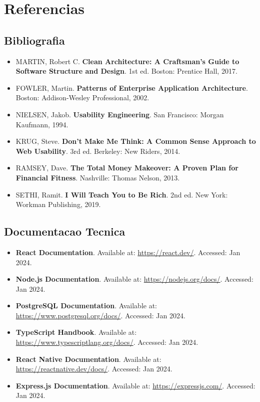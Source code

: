 \section{Referencias}

\subsection{Bibliografia}

\begin{itemize}
    \item MARTIN, Robert C. \textbf{Clean Architecture: A Craftsman's Guide to Software Structure and Design}. 1st ed. Boston: Prentice Hall, 2017.
    
    \item FOWLER, Martin. \textbf{Patterns of Enterprise Application Architecture}. Boston: Addison-Wesley Professional, 2002.
    
    \item NIELSEN, Jakob. \textbf{Usability Engineering}. San Francisco: Morgan Kaufmann, 1994.
    
    \item KRUG, Steve. \textbf{Don't Make Me Think: A Common Sense Approach to Web Usability}. 3rd ed. Berkeley: New Riders, 2014.
    
    \item RAMSEY, Dave. \textbf{The Total Money Makeover: A Proven Plan for Financial Fitness}. Nashville: Thomas Nelson, 2013.
    
    \item SETHI, Ramit. \textbf{I Will Teach You to Be Rich}. 2nd ed. New York: Workman Publishing, 2019.
\end{itemize}

\subsection{Documentacao Tecnica}

\begin{itemize}
    \item \textbf{React Documentation}. Available at: \url{https://react.dev/}. Accessed: Jan 2024.
    
    \item \textbf{Node.js Documentation}. Available at: \url{https://nodejs.org/docs/}. Accessed: Jan 2024.
    
    \item \textbf{PostgreSQL Documentation}. Available at: \url{https://www.postgresql.org/docs/}. Accessed: Jan 2024.
    
    \item \textbf{TypeScript Handbook}. Available at: \url{https://www.typescriptlang.org/docs/}. Accessed: Jan 2024.
    
    \item \textbf{React Native Documentation}. Available at: \url{https://reactnative.dev/docs/}. Accessed: Jan 2024.
    
    \item \textbf{Express.js Documentation}. Available at: \url{https://expressjs.com/}. Accessed: Jan 2024.
\end{itemize}

